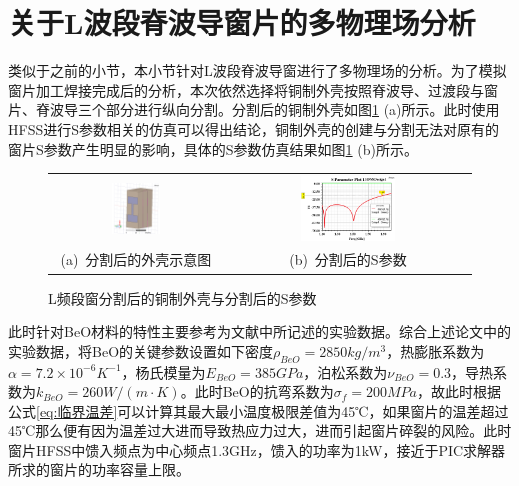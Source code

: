 \documentclass[master]{thesis-uestc}
\begin{document}
\section{关于L波段脊波导窗片的多物理场分析}
类似于之前的小节，本小节针对L波段脊波导窗进行了多物理场的分析。为了模拟窗片加工焊接完成后的分析，本次依然选择将铜制外壳按照脊波导、过渡段与窗片、脊波导三个部分进行纵向分割。分割后的铜制外壳如图\ref{fig:L分割后的铜制外壳} (a)所示。此时使用HFSS进行S参数相关的仿真可以得出结论，铜制外壳的创建与分割无法对原有的窗片S参数产生明显的影响，具体的S参数仿真结果如图\ref{fig:L分割后的铜制外壳} (b)所示。
\begin{figure}[!htb]
    \small
    \centering
    \begin{tabular}{@{\ }c@{\ }c}
        \includegraphics[width=0.3\textwidth]{pic/chapter4/L频段分割后的铜制外壳.png} & 
        \hspace{5pt}
        \includegraphics[width=0.4\textwidth]{pic/chapter4/L频段分割铜制外壳后的S曲线.png}     \\
        \mbox{\small (a) 分割后的外壳示意图}                                                                               & 
        \mbox{\small (b) 分割后的S参数}                                                                                  \\
    \end{tabular}
    \caption{L频段窗分割后的铜制外壳与分割后的S参数}
    \label{fig:L分割后的铜制外壳}
\end{figure}

此时针对BeO材料的特性主要参考为文献\cite{thumm_stateart_2020, slack_thermal_1971,kozlovskii_thermal_2014}中所记述的实验数据。综合上述论文中的实验数据，将BeO的关键参数设置如下密度\(\rho_{BeO} = 2850kg/m^3\)，热膨胀系数为\(\alpha = 7.2 \times 10^{-6} K^{-1}\)，杨氏模量为\(E_{BeO} = 385GPa\)，泊松系数为\(\nu_{BeO} = 0.3\)，导热系数为\(k_{BeO} = 260 W/(m \cdot K)\)。此时BeO的抗弯系数为$\sigma_f = 200MPa$，故此时根据公式\ref{eq:临界温差}可以计算其最大最小温度极限差值为45℃，如果窗片的温差超过45℃那么便有因为温差过大进而导致热应力过大，进而引起窗片碎裂的风险。此时窗片HFSS中馈入频点为中心频点1.3GHz，馈入的功率为1kW，接近于PIC求解器所求的窗片的功率容量上限。
\end{document}
